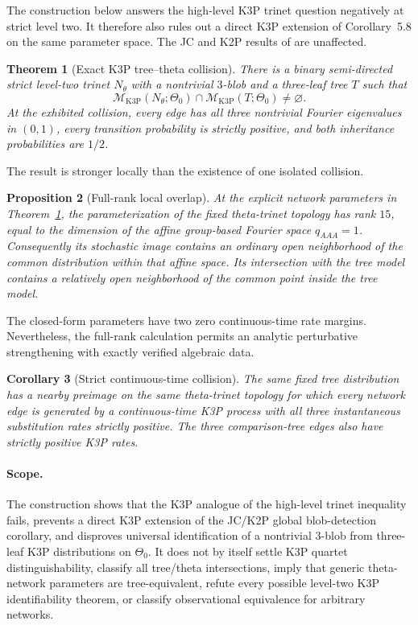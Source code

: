 \documentclass[11pt]{article}
\newtheorem{theorem}{Theorem}
\newtheorem{proposition}[theorem]{Proposition}
\newtheorem{corollary}[theorem]{Corollary}
\theoremstyle{remark}
\newcommand{\cM}{\mathcal{M}}
\newcommand{\ThetaZero}{\Theta_{0}}
\newcommand{\KthreeP}{\mathrm{K3P}}
\begin{document}
The construction below answers the high-level K3P trinet question negatively at strict level two.  It therefore also rules out a direct K3P extension of Corollary~5.8 on the same parameter space.  The JC and K2P results of \cite{BritsHoltgrefeVanIerselMartin2026} are unaffected.

\begin{theorem}[Exact K3P tree--theta collision]\label{thm:collision}
There is a binary semi-directed strict level-two trinet $N_{\theta}$ with a nontrivial $3$-blob and a three-leaf tree $T$ such that
\[
  \cM_{\KthreeP}(N_{\theta};\ThetaZero)
  \cap
  \cM_{\KthreeP}(T;\ThetaZero)
  \neq \varnothing.
\]
At the exhibited collision, every edge has all three nontrivial Fourier eigenvalues in $(0,1)$, every transition probability is strictly positive, and both inheritance probabilities are $1/2$.
\end{theorem}

The result is stronger locally than the existence of one isolated collision.

\begin{proposition}[Full-rank local overlap]\label{prop:rank}
At the explicit network parameters in Theorem~\ref{thm:collision}, the parameterization of the fixed theta-trinet topology has rank $15$, equal to the dimension of the affine group-based Fourier space $q_{AAA}=1$.  Consequently its stochastic image contains an ordinary open neighborhood of the common distribution within that affine space.  Its intersection with the tree model contains a relatively open neighborhood of the common point inside the tree model.
\end{proposition}

The closed-form parameters have two zero continuous-time rate margins.  Nevertheless, the full-rank calculation permits an analytic perturbative strengthening with exactly verified algebraic data.

\begin{corollary}[Strict continuous-time collision]\label{cor:ct}
The same fixed tree distribution has a nearby preimage on the same theta-trinet topology for which every network edge is generated by a continuous-time K3P process with all three instantaneous substitution rates strictly positive.  The three comparison-tree edges also have strictly positive K3P rates.
\end{corollary}


\paragraph{Scope.}
The construction shows that the K3P analogue of the high-level trinet inequality fails, prevents a direct K3P extension of the JC/K2P global blob-detection corollary, and disproves universal identification of a nontrivial $3$-blob from three-leaf K3P distributions on $\ThetaZero$.  It does not by itself settle K3P quartet distinguishability, classify all tree/theta intersections, imply that generic theta-network parameters are tree-equivalent, refute every possible level-two K3P identifiability theorem, or classify observational equivalence for arbitrary networks.
\end{document}
